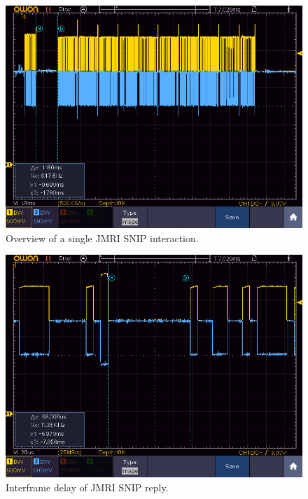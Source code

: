 \documentclass[11pt]{article}
\begin{document}
\begin{figure}[!htbp]
\centering
\includegraphics[width=1.0\linewidth]{1SNIP_JMRI_Full}
\caption{Overview of a single JMRI SNIP interaction.}
\label{fig:single_JMRI_SNIP_interaction}
\end{figure}

\begin{figure}[!htbp]
\centering
\includegraphics[width=1.0\linewidth]{1SNIP_JMRI_Spacing}
\caption{Interframe delay of JMRI SNIP reply.}
\label{fig:single_JMRI_SNIP_interframe}
\end{figure}
\end{document}
